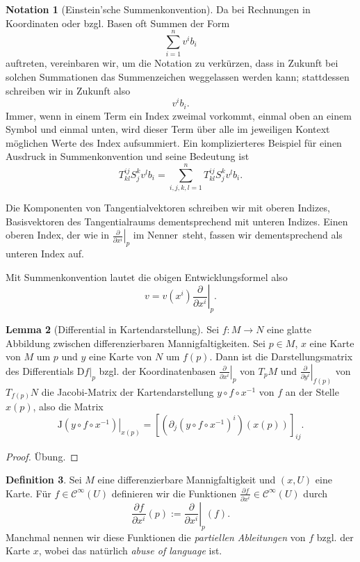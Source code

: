 \documentclass[a4paper]{scrbook}
\numberwithin{equation}{chapter}
\newcommand{\DD}{\mathrm{D}}
\newcommand{\sC}{\mathcal{C}^{\infty}}
\theoremstyle{definition}
\newtheorem{defn}{Definition}[section]
\newtheorem{lemma}[defn]{Lemma}
\newtheorem{nota}[defn]{Notation}
\newcommand{\bewUeb}{\begin{proof}Übung.\end{proof}}
\begin{document}
\begin{nota}[Einstein'sche Summenkonvention]
	Da bei Rechnungen in Koordinaten oder bzgl. Basen oft Summen der Form
	\[\sum_{i=1}^n v^i b_i\]
	auftreten, vereinbaren wir, um die Notation zu verkürzen, dass in Zukunft bei solchen Summationen das Summenzeichen weggelassen werden kann; stattdessen schreiben wir in Zukunft also
	\[v^i b_i.\]
	Immer, wenn in einem Term ein Index zweimal vorkommt, einmal oben an einem Symbol und einmal unten, wird dieser Term über alle im jeweiligen Kontext möglichen Werte des Index aufsummiert. Ein komplizierteres Beispiel für einen Ausdruck in Summenkonvention und seine Bedeutung ist
	\[T^{ij}_{kl} S^k_j v^l b_i = \sum_{i,j,k,l = 1}^n T^{ij}_{kl} S^k_j v^l b_i.\]

	Die Komponenten von Tangentialvektoren schreiben wir mit oberen Indizes, Basisvektoren des Tangentialraums dementsprechend mit unteren Indizes. Einen oberen Index, der wie in $\left.\frac{\partial}{\partial x^i}\right|_p$ \glqq im Nenner\grqq\ steht, fassen wir dementsprechend als unteren Index auf.

	Mit Summenkonvention lautet die obigen Entwicklungsformel also
	\[v = v(x^i) \left.\frac{\partial}{\partial x^i}\right|_p.\]
\end{nota}

\begin{lemma}[Differential in Kartendarstellung] \label{lemma:differential_koord}
	Sei $f\colon M \to N$ eine glatte Abbildung zwischen differenzierbaren Mannigfaltigkeiten. Sei $p\in M$, $x$ eine Karte von $M$ um $p$ und $y$ eine Karte von $N$ um $f(p)$. Dann ist die Darstellungsmatrix des Differentials $\left.\DD f\right|_p$ bzgl. der Koordinatenbasen $\left.\frac{\partial}{\partial x^i}\right|_p$ von $T_pM$ und $\left.\frac{\partial}{\partial y^i}\right|_{f(p)}$ von $T_{f(p)}N$ die Jacobi-Matrix der Kartendarstellung $y \circ f \circ x^{-1}$ von $f$ an der Stelle $x(p)$, also die Matrix
	\[\left.\mathrm{J}(y\circ f\circ x^{-1})\right|_{x(p)} = \left[\left(\partial_j(y\circ f\circ x^{-1})^i\right) (x(p)) \right]_{ij}.\]
	\bewUeb
\end{lemma}

\begin{defn}
	Sei $M$ eine differenzierbare Mannigfaltigkeit und $(x,U)$ eine Karte. Für $f \in \sC(U)$ definieren wir die Funktionen $\frac{\partial f}{\partial x^i} \in \sC(U)$ durch
	\[\frac{\partial f}{\partial x^i}(p) := \left.\frac{\partial}{\partial x^i}\right|_p(f).\]
	Manchmal nennen wir diese Funktionen die \emph{partiellen Ableitungen} von $f$ bzgl. der Karte $x$, wobei das natürlich \emph{abuse of language} ist.
\end{defn}
\end{document}
